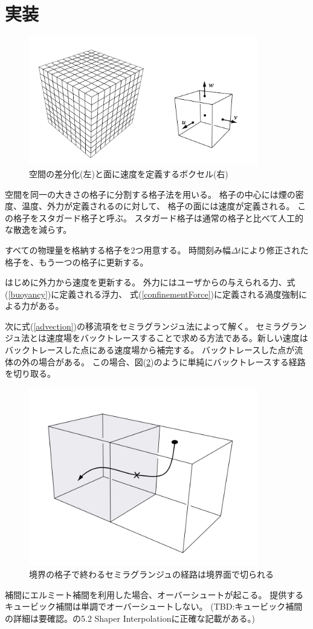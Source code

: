 \documentclass{ujarticle}
\begin{document}
\section{実装}
\begin{figure}
	\begin{center}
		\includegraphics[width=100mm]{grid.png}
		\caption{空間の差分化(左)と面に速度を定義するボクセル(右)}
		\label{grid}
	\end{center}
\end{figure}
空間を同一の大きさの格子に分割する格子法を用いる。
格子の中心には煙の密度、温度、外力が定義されるのに対して、
格子の面には速度が定義される。
この格子をスタガード格子と呼ぶ。
スタガード格子は通常の格子と比べて人工的な散逸を減らす。

すべての物理量を格納する格子を2つ用意する。
時間刻み幅$\Delta t$により修正された格子を、もう一つの格子に更新する。

はじめに外力から速度を更新する。
外力にはユーザからの与えられる力、式(\ref{buoyancy})に定義される浮力、
式(\ref{confinementForce})に定義される渦度強制による力がある。

次に式(\ref{advection})の移流項をセミラグランジュ法によって解く。
セミラグランジュ法とは速度場をバックトレースすることで求める方法である。新しい速度はバックトレースした点にある速度場から補完する。
バックトレースした点が流体の外の場合がある。
この場合、図(\ref{path})のように単純にバックトレースする経路を切り取る。
\begin{figure}
	\begin{center}
		\includegraphics[width=100mm]{path.png}
		\caption{境界の格子で終わるセミラグランジュの経路は境界面で切られる}
		\label{path}
	\end{center}
\end{figure}
補間にエルミート補間を利用した場合、オーバーシュートが起こる。
提供するキュービック補間は単調でオーバーシュートしない。
(TBD:キュービック補間の詳細は要確認。\cite{Bridson2007}の5.2 Shaper Interpolationに正確な記載がある。)
\end{document}
